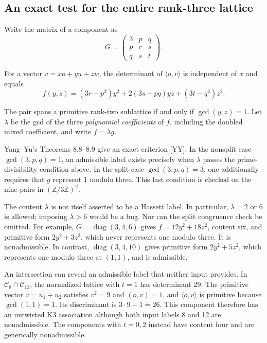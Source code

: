\documentclass[
  american,
  11pt,
  a4paper,
]{article}
\begin{document}
\subsection{An exact test for the entire rank-three
lattice}\label{an-exact-test-for-the-entire-rank-three-lattice}

Write the matrix of a component as
\[G=\begin{pmatrix}3&p&q\\p&r&s\\q&s&t\end{pmatrix}.\]

For a vector \(v=x o+y u+z w\), the determinant of
\(\langle o,v\rangle\) is independent of \(x\) and equals
\[f(y,z)=(3r-p^2)y^2+2(3s-pq)yz+(3t-q^2)z^2.\]

The pair spans a primitive rank-two sublattice if and only if
\(\gcd(y,z)=1\). Let \(\lambda\) be the gcd of the three
\emph{polynomial coefficients} of \(f\), including the doubled mixed
coefficient, and write \(f=\lambda g\).

Yang--Yu's Theorems 8.8--8.9 give an exact criterion {[}YY{]}. In the
nonsplit case \(\gcd(3,p,q)=1\), an admissible label exists precisely
when \(\lambda\) passes the prime-divisibility condition above. In the
split case \(\gcd(3,p,q)=3\), one additionally requires that \(g\)
represent \(1\) modulo three. This last condition is checked on the nine
pairs in \((\mathbb Z/3\mathbb Z)^2\).

The content \(\lambda\) is not itself asserted to be a Hassett label. In
particular, \(\lambda=2\) or \(6\) is allowed; imposing \(\lambda>6\)
would be a bug. Nor can the split congruence check be omitted. For
example, \(G=\operatorname{diag}(3,4,6)\) gives \(f=12y^2+18z^2\),
content six, and primitive form \(2y^2+3z^2\), which never represents
one modulo three. It is nonadmissible. In contrast,
\(\operatorname{diag}(3,4,10)\) gives primitive form \(2y^2+5z^2\),
which represents one modulo three at \((1,1)\), and is admissible.

An intersection can reveal an admissible label that neither input
provides. In \(\mathcal C_8\cap\mathcal C_{12}\), the normalized lattice
with \(t=1\) has determinant 29. The primitive vector \(v=u_1+u_2\)
satisfies \(v^2=9\) and \((o,v)=1\), and \(\langle o,v\rangle\) is
primitive because \(\gcd(1,1)=1\). Its discriminant is \(3\cdot9-1=26\).
This component therefore has an untwisted K3 association although both
input labels 8 and 12 are nonadmissible. The components with \(t=0,2\)
instead have content four and are generically nonadmissible.
\end{document}
